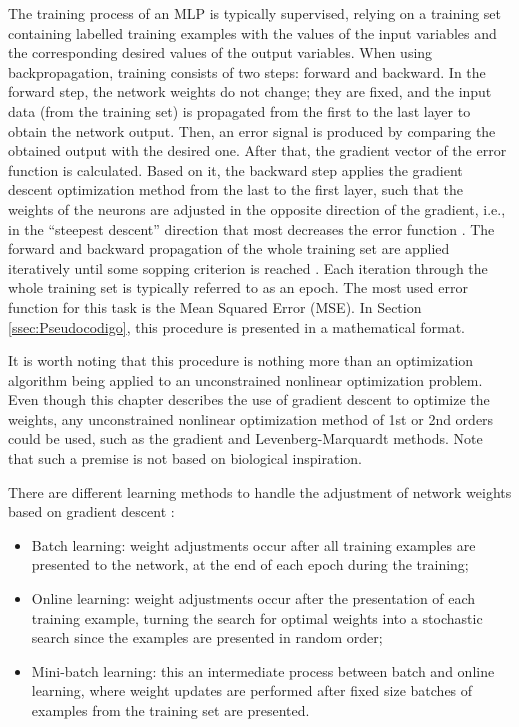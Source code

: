 The training process of an MLP is typically supervised, relying on a training set containing labelled training examples with the values of the input variables and the corresponding desired values of the output variables. When using backpropagation, training consists of two steps: forward and backward. In the forward step, the network weights do not change; they are fixed, and the input data (from the training set) is propagated from the first to the last layer to obtain the network output. Then, an error signal is produced by comparing the obtained output with the desired one. After that, the gradient vector of the error function is calculated. Based on it, the backward step applies the gradient descent optimization method from the last to the first layer, such that the weights of the neurons are adjusted in the opposite direction of the gradient, i.e., in the ``steepest descent'' direction that most decreases the error function \cite{haykin}. The forward and backward propagation of the whole training set are applied iteratively until some sopping criterion is reached \cite{Castro2006FundamentalsON}. Each iteration through the whole training set is typically referred to as an epoch. The most used error function for this task is the Mean Squared Error (MSE).  In Section \ref{ssec:Pseudocodigo}, this procedure is presented in a mathematical format. 

It is worth noting that this procedure is nothing more than an optimization algorithm being applied to an unconstrained nonlinear optimization problem. Even though this chapter describes the use of gradient descent to optimize the weights, any unconstrained nonlinear optimization method of 1st or 2nd orders could be used, such as the gradient and Levenberg-Marquardt methods. Note that such a premise is not based on biological inspiration.

There are different learning methods to handle the adjustment of network weights based on gradient descent \cite{haykin, Bengio2012}:

\begin{itemize}
	\item Batch learning: weight adjustments occur after all training examples are presented to the network, at the end of each epoch during the training;
	\item Online learning: weight adjustments occur after the presentation of each training example, turning the search for optimal weights into a stochastic search since the examples are presented in random order;
	\item Mini-batch learning: this an intermediate process between batch and online learning, where weight updates are performed after fixed size batches of examples from the training set are presented.
\end{itemize}

